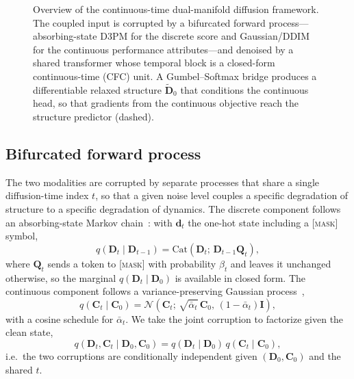 \documentclass[review]{elsarticle}
\begin{document}
\begin{figure}[t]
{}
\caption{Overview of the continuous-time dual-manifold diffusion framework. The coupled
input is corrupted by a bifurcated forward process---absorbing-state D3PM for the discrete
score and Gaussian/DDIM for the continuous performance attributes---and denoised by a shared
transformer whose temporal block is a closed-form continuous-time (CFC) unit. A
Gumbel--Softmax bridge produces a differentiable relaxed structure
$\tilde{\mathbf{D}}_0$ that conditions the continuous head, so that gradients from the
continuous objective reach the structure predictor (dashed).}
\label{fig:arch}
\end{figure}

\subsection{Bifurcated forward process}
\label{sec:forward}
The two modalities are corrupted by separate processes that share a single diffusion-time
index $t$, so that a given noise level couples a specific degradation of structure to a
specific degradation of dynamics. The discrete component follows an absorbing-state Markov
chain~\cite{austin2021d3pm}: with $\mathbf{d}_t$ the one-hot state including a
\textsc{[mask]} symbol,
\begin{equation}
q(\mathbf{D}_t\mid\mathbf{D}_{t-1}) = \mathrm{Cat}\!\left(\mathbf{D}_t;\,\mathbf{D}_{t-1}\mathbf{Q}_t\right),
\end{equation}
where $\mathbf{Q}_t$ sends a token to \textsc{[mask]} with probability $\beta_t$ and leaves
it unchanged otherwise, so the marginal $q(\mathbf{D}_t\mid\mathbf{D}_0)$ is available in
closed form. The continuous component follows a variance-preserving Gaussian
process~\cite{ho2020ddpm,song2021ddim},
\begin{equation}
q(\mathbf{C}_t\mid\mathbf{C}_0) = \mathcal{N}\!\left(\mathbf{C}_t;\,\sqrt{\bar\alpha_t}\,\mathbf{C}_0,\,(1-\bar\alpha_t)\mathbf{I}\right),
\end{equation}
with a cosine schedule for $\bar\alpha_t$. We take the joint corruption to factorize given
the clean state,
\begin{equation}
q(\mathbf{D}_t,\mathbf{C}_t\mid\mathbf{D}_0,\mathbf{C}_0)
=q(\mathbf{D}_t\mid\mathbf{D}_0)\,q(\mathbf{C}_t\mid\mathbf{C}_0),
\label{eq:factorize}
\end{equation}
i.e.\ the two corruptions are conditionally independent given $(\mathbf{D}_0,\mathbf{C}_0)$
and the shared $t$.
\end{document}
